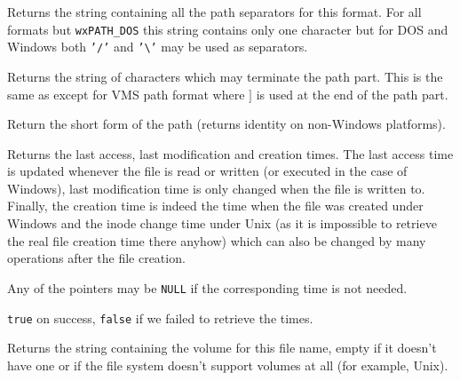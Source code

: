 Returns the string containing all the path separators for this format. For all
formats but {\tt wxPATH\_DOS} this string contains only one character but for
DOS and Windows both {\tt '/'} and {\tt '\textbackslash'} may be used as
separators.




\label{wxfilenamegetpathterminators}


Returns the string of characters which may terminate the path part. This is the
same as  except for VMS
path format where $]$ is used at the end of the path part.


\label{wxfilenamegetshortpath}


Return the short form of the path (returns identity on non-Windows platforms).


\label{wxfilenamegettimes}


Returns the last access, last modification and creation times. The last access
time is updated whenever the file is read or written (or executed in the case
of Windows), last modification time is only changed when the file is written
to. Finally, the creation time is indeed the time when the file was created
under Windows and the inode change time under Unix (as it is impossible to
retrieve the real file creation time there anyhow) which can also be changed
by many operations after the file creation.

Any of the pointers may be {\tt NULL} if the corresponding time is not
needed.


{\tt true} on success, {\tt false} if we failed to retrieve the times.


\label{wxfilenamegetvolume}


Returns the string containing the volume for this file name, empty if it
doesn't have one or if the file system doesn't support volumes at all (for
example, Unix).


